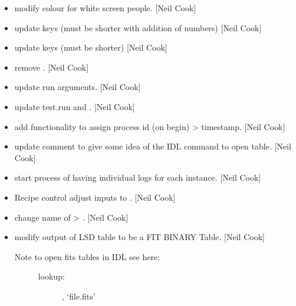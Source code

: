 \documentclass[a4paper,10pt,english]{report}
\begin{document}
\label{\detokenize{misc/changelog:id268}}\begin{itemize}
\item {} 
 \sphinxhyphen{} modify colour for white screen people. {[}Neil Cook{]}

\item {} 
 \sphinxhyphen{} update keys (must be shorter with addition of
numbers) {[}Neil Cook{]}

\item {} 
 \sphinxhyphen{} update keys (must be shorter) {[}Neil Cook{]}

\item {} 
 \sphinxhyphen{} remove . {[}Neil Cook{]}

\item {} 
 \sphinxhyphen{} update run arguments. {[}Neil Cook{]}

\item {} 
 \sphinxhyphen{} update test.run and . {[}Neil Cook{]}

\item {} 
 \sphinxhyphen{} add functionality to assign process id (on begin)
\textendash{}\textgreater{} timestamp. {[}Neil Cook{]}

\item {} 
 \sphinxhyphen{} update comment to give some idea of the IDL command
to open table. {[}Neil Cook{]}

\item {} 
 \sphinxhyphen{} start process of having individual logs for each
instance. {[}Neil Cook{]}

\item {} 
Recipe control \sphinxhyphen{} adjust inputs to . {[}Neil Cook{]}

\item {} 
 \sphinxhyphen{} change name of  \textendash{}\textgreater{}
. {[}Neil Cook{]}

\item {} 
 \sphinxhyphen{} modify output of LSD table to be a FIT BINARY Table.
{[}Neil Cook{]}
\begin{description}
\item[{Note to open fits tables in IDL see here:}] \leavevmode
{}
\begin{description}
\item[{lookup:}] \leavevmode
{}, ‘file.fits’


\end{description}
\end{description}
\end{itemize}
\end{document}
